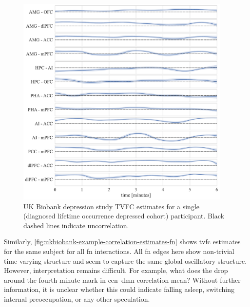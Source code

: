 \begin{figure}[ht]
  \centering
  \includegraphics[width=0.95\textwidth]{fig/ukbiobank/TVFC_predictions/ROI/correlation_UKB1000211_TVFC_predictions}
  \caption{
    UK Biobank depression study TVFC estimates for a single (diagnosed lifetime occurrence depressed cohort) participant.
    Black dashed lines indicate uncorrelation.
  }\label{fig:ukbiobank-example-correlation-estimates-roi}
\end{figure}


Similarly, \cref{fig:ukbiobank-example-correlation-estimates-fn} shows \gls{tvfc} estimates for the same subject for all \gls{fn} interactions.
All \gls{fn} edges here show non-trivial time-varying structure and seem to capture the same global oscillatory structure.
%
However, interpretation remains difficult.
For example, what does the drop around the fourth minute mark in \gls{cen}--\gls{dmn} correlation mean?
Without further information, it is unclear whether this could indicate falling asleep, switching internal preoccupation, or any other speculation.


